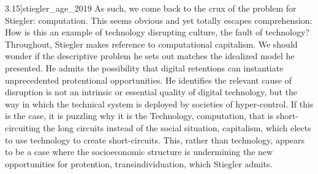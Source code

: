 \documentclass[letterpaper,notitlepage,12pt]{article}
\begin{document}
3.15]{stiegler_age_2019}
As such, we come back to the crux of the problem for Stiegler: computation.
This seems obvious and yet totally escapes comprehension: How is this an example
of technology disrupting culture, the fault of technology?
Throughout, Stiegler makes reference to computational capitalism.
We should wonder if the descriptive problem he sets out matches the idealized
model he presented.
He admits the possibility that digital retentions can instantiate unprecedented
protentional opportunities.
He identifies the relevant cause of disruption is not an intrinsic or essential
quality of digital technology, but the way in which the technical system is
deployed by societies of hyper-control.
If this is the case, it is puzzling why it is the Technology, computation, that
is short-circuiting the long circuits instead of the social situation,
capitalism, which elects to use technology to create short-circuits.
This, rather than technology, appears to be a case where the socioeconomic
structure is undermining the new opportunities for protention,
transindividuation, which Stiegler admits.
\end{document}
